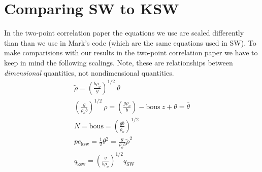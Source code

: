 \documentclass[12pt]{article}
\begin{document}
\section{Comparing SW to KSW}
In the two-point correlation paper the equations we use are scaled
differently than than we use in Mark's code (which are the same
equations used in SW). To make comparisions with our results in the
two-point correlation paper we have to keep in mind the following
scalings. Note, these are relationships between {\sl{dimensional}}
quantities, not nondimensional quantities.
\begin{gather}
\tilde\rho = (\frac{b \rho_o}{g})^{1/2} ~\theta\\
(\frac{g}{\rho_o b})^{1/2}~\rho = (\frac{g \rho_o}{b}) - \text{bous}
~z + \theta = \bar\theta \\
N = \text{bous} = (\frac{g b}{\rho_o})^{1/2}\\
pe_{\text{ksw}} = \frac{1}{2} \theta^2 = \frac{g}{\rho_o b} \tilde\rho^2\\
q_{\text{ksw}} = (\frac{g}{b \rho_o})^{1/2} q_{\text{SW}}
\end{gather}
\end{document}
